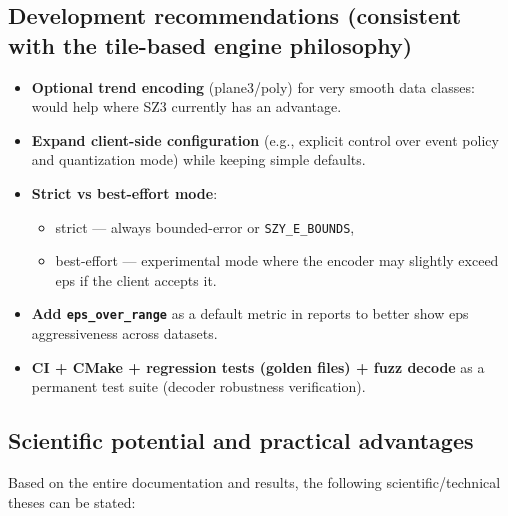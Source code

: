 \documentclass[11pt,a4paper]{article}
\begin{document}
\subsection{Development recommendations (consistent with the tile-based engine philosophy)}
\begin{itemize}
  \item \textbf{Optional trend encoding} (plane3/poly) for very smooth data classes: would help where SZ3 currently has an advantage.
  \item \textbf{Expand client-side configuration} (e.g., explicit control over event policy and quantization mode) while keeping simple defaults.
  \item \textbf{Strict vs best-effort mode}:
        \begin{itemize}
          \item strict --- always bounded-error or \texttt{SZY\_E\_BOUNDS},
          \item best-effort --- experimental mode where the encoder may slightly exceed eps if the client accepts it.
        \end{itemize}
  \item \textbf{Add \texttt{eps\_over\_range}} as a default metric in reports to better show eps aggressiveness across datasets.
  \item \textbf{CI + CMake + regression tests (golden files) + fuzz decode} as a permanent test suite (decoder robustness verification).
\end{itemize}

\subsection{Scientific potential and practical advantages}
Based on the entire documentation and results, the following scientific/technical theses can be stated:
\end{document}
